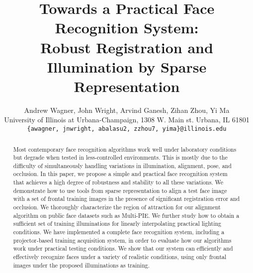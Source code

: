 \documentclass[10pt,twocolumn,letterpaper]{article}
\begin{document}
\title{Towards a Practical Face Recognition System: \\ Robust Registration and
Illumination by Sparse Representation\vspace{-4mm}}

\author{Andrew Wagner, John Wright, Arvind Ganesh, Zihan Zhou, Yi Ma\\
University of Illinois at Urbana-Champaign, 1308 W. Main st. Urbana, IL 61801\\
{\tt\small \{awagner, jnwright, abalasu2, zzhou7, yima\}@illinois.edu}}

\maketitle

\begin{abstract}\vspace{-2mm}
Most contemporary face recognition algorithms work well under
laboratory conditions but degrade when tested in less-controlled environments. This is mostly due to the difficulty of simultaneously 
handling variations in illumination, alignment, pose, and occlusion.
In this paper, we propose a simple and practical  face recognition system that achieves a high degree of  
robustness and stability to all these variations. We demonstrate how to use tools from sparse representation 
to align a test face image with a set of frontal training 
images in the presence of significant registration error and occlusion. We thoroughly characterize the region 
of attraction for our alignment algorithm on public face datasets such as Multi-PIE. 
We further study how to obtain a sufficient set of training illuminations for linearly  
interpolating practical lighting conditions. We have implemented a complete face recognition
system, including a projector-based training acquisition system, in order to evaluate how our algorithms work under practical testing conditions. We show  
that our system can efficiently and effectively recognize faces under  
a variety of realistic conditions, using only 
frontal images under the proposed illuminations as training.\vspace{-10mm}
\end{abstract}

\end{document}
